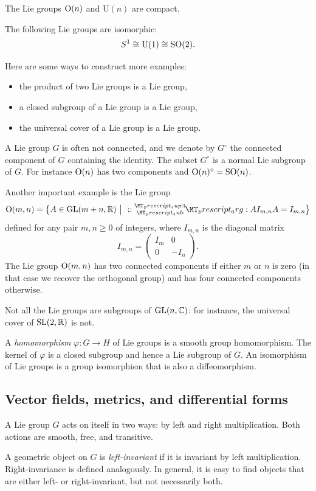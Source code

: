 The Lie groups ${\rm O}(n)$ and U$(n)$ are compact.
\begin{ex}
The following Lie groups are isomorphic:
$$S^1 \cong {\rm U}(1) \cong {\rm SO}(2). $$
\end{ex}
Here are some ways to construct more examples:
\begin{itemize}
\item the product of two Lie groups is a Lie group,
\item a closed subgroup of a Lie group is a Lie group,
\item the universal cover of a Lie group is a Lie group.
\end{itemize}

A Lie group $G$ is often not connected, and we denote by $G^\circ$ the connected component of $G$ containing the identity. The subset $G^\circ$ is a normal Lie subgroup of $G$. For instance ${\rm O}(n)$ has two components and ${\rm O}(n)^\circ = {\rm SO}(n)$. 

Another important example is the Lie group
$$\On(m,n) = \big\{A \in \GL(m+n,\matR) \ \big| \ \transp A I_{m,n} A = I_{m,n} \big\}$$
defined for any pair $m,n \geqslant 0$ of integers, where $I_{m,n}$ is the diagonal matrix
$$I_{m,n} = \begin{pmatrix} I_m & 0 \\ 0 & -I_n \end{pmatrix}.$$
The Lie group ${\rm O}(m,n)$ has two connected components if either $m$ or $n$ is zero (in that case we recover the orthogonal group) and has four connected components otherwise.

\begin{oss}
Not all the Lie groups are subgroups of ${\rm GL}(n,\mathbb{C})$: for instance, the universal cover of ${\rm SL}(2,\mathbb{R})$ is not.
\end{oss}

A \emph{homomorphism} $\varphi \colon G \to H$ of Lie groups is a smooth group homomorphism. The kernel of $\varphi$ is a closed subgroup and hence a Lie subgroup of $G$. An isomorphism of Lie groups is a group isomorphism that is also a diffeomorphism. 

\subsection{Vector fields, metrics, and differential forms}
A Lie group $G$ acts on itself in two ways: by left and right multiplication. Both actions are smooth, free, and transitive.

A geometric object on $G$ is \emph{left-invariant} if it is invariant by left multiplication. Right-invariance is defined analogously. In general, it is easy to find objects that are either left- or right-invariant, but not necessarily both. 


